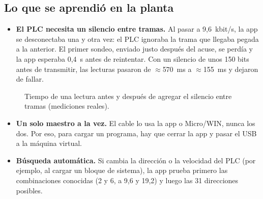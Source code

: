 \documentclass[a4paper,11pt]{article}
\begin{document}
\subsection{Lo que se aprendió en la planta}
\begin{itemize}
\item \textbf{El PLC necesita un silencio entre tramas.} Al pasar a 9,6~kbit/s, la app se desconectaba una y otra vez: el PLC ignoraba la trama que llegaba pegada a la anterior. El primer sondeo, enviado justo después del acuse, se perdía y la app esperaba 0,4~s antes de reintentar. Con un silencio de unos 150 bits antes de transmitir, las lecturas pasaron de $\approx$570~ms a $\approx$155~ms y dejaron de fallar.
\end{itemize}

\begin{figure}[H]
\centering
{}
\caption{Tiempo de una lectura antes y después de agregar el silencio entre tramas (mediciones reales).}
\end{figure}

\begin{itemize}
\item \textbf{Un solo maestro a la vez.} El cable lo usa la app o Micro/WIN, nunca los dos. Por eso, para cargar un programa, hay que cerrar la app y pasar el USB a la máquina virtual.
\item \textbf{Búsqueda automática.} Si cambia la dirección o la velocidad del PLC (por ejemplo, al cargar un bloque de sistema), la app prueba primero las combinaciones conocidas (2 y 6, a 9,6 y 19,2) y luego las 31 direcciones posibles.
\end{itemize}
\end{document}
